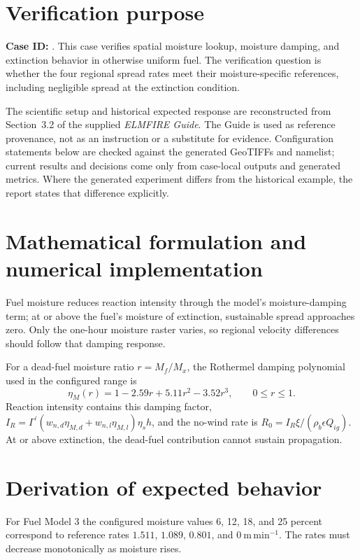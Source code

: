 \section{Verification purpose}

\textbf{Case ID:} \texttt{\CaseID}. This case verifies spatial moisture lookup, moisture damping, and extinction behavior in otherwise uniform fuel.  The verification question is whether the four regional spread rates meet their moisture-specific references, including negligible spread at the extinction condition.

The scientific setup and historical expected response are reconstructed from Section~3.2 of the supplied \emph{ELMFIRE Guide}. The Guide is used as reference provenance, not as an instruction or a substitute for evidence. Configuration statements below are checked against the generated GeoTIFFs and namelist; current results and decisions come only from case-local outputs and generated metrics. Where the generated experiment differs from the historical example, the report states that difference explicitly.

\section{Mathematical formulation and numerical implementation}

Fuel moisture reduces reaction intensity through the model's moisture-damping term; at or above the fuel's moisture of extinction, sustainable spread approaches zero.  Only the one-hour moisture raster varies, so regional velocity differences should follow that damping response.

For a dead-fuel moisture ratio \(r=M_f/M_x\), the Rothermel damping polynomial used in the configured range is
\begin{equation}
\eta_M(r)=1-2.59r+5.11r^2-3.52r^3, \qquad 0\le r\le1.
\end{equation}
Reaction intensity contains this damping factor, \(I_R=\Gamma^{\prime}(w_{n,d}\eta_{M,d}+w_{n,l}\eta_{M,l})\eta_s h\), and the no-wind rate is \(R_0=I_R\xi/(\rho_b\epsilon Q_{ig})\). At or above extinction, the dead-fuel contribution cannot sustain propagation.

\section{Derivation of expected behavior}

For Fuel Model 3 the configured moisture values 6, 12, 18, and 25 percent correspond to reference rates \(1.511\), \(1.089\), \(0.801\), and \(0~\mathrm{m\,min^{-1}}\).  The rates must decrease monotonically as moisture rises.

